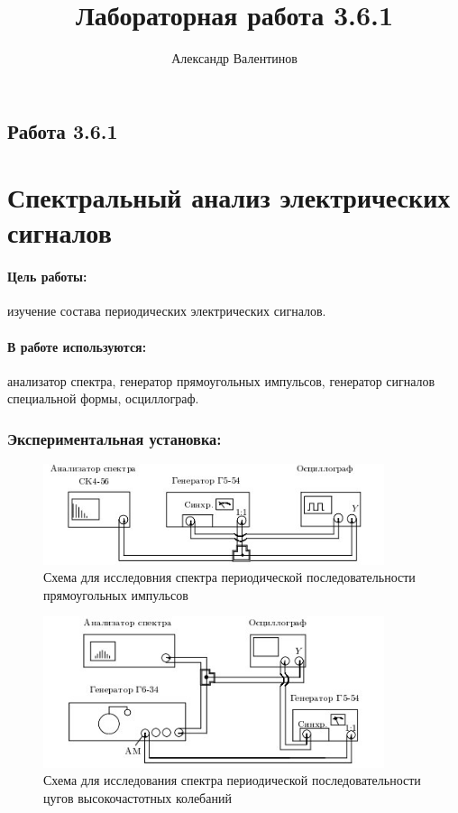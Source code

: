 \documentclass{article}
\author{Александр Валентинов}
\title{Лабораторная работа 3.6.1}
\begin{document}
   \subsection*{Работа 3.6.1}
   \section*{Спектральный анализ электрических сигналов}
   
   \paragraph{Цель работы:} изучение состава периодических электрических сигналов.
   
   \paragraph{В работе используются:} анализатор спектра, генератор прямоугольных импульсов, генератор сигналов специальной формы, осциллограф.
   
   \subsubsection*{Экспериментальная установка:}
   
   \begin{figure}[h]
   \centering
   \includegraphics[width=10cm]{3_6_1a.jpg} 
   \caption{Схема для исследовния спектра периодической последовательности прямоугольных импульсов} 
   \label{fig.1} 
   \end{figure}
   
   \begin{figure}[h]
   \centering
   \includegraphics[width=10cm]{3_6_1b.jpg} 
   \caption{Схема для исследования спектра периодической последовательности цугов высокочастотных колебаний} 
   \label{fig.2} 
   \end{figure}
\end{document}
